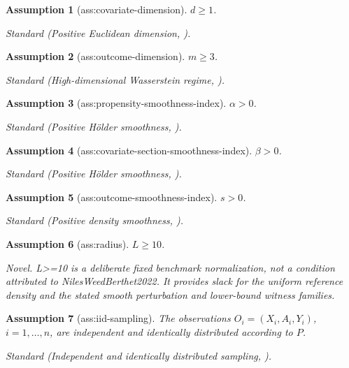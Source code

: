 \documentclass{article}
\newtheorem{assumption}{Assumption}
\begin{document}
\begin{assumption}[ass:covariate-dimension]\label{ass:covariate-dimension}
\(d\ge 1\).
\par\smallskip\noindent\emph{Standard} (Positive Euclidean dimension, \cite{NilesWeedBerthet2022}).
\end{assumption}

\begin{assumption}[ass:outcome-dimension]\label{ass:outcome-dimension}
\(m\ge 3\).
\par\smallskip\noindent\emph{Standard} (High-dimensional Wasserstein regime, \cite{NilesWeedBerthet2022}).
\end{assumption}

\begin{assumption}[ass:propensity-smoothness-index]\label{ass:propensity-smoothness-index}
\(\alpha>0\).
\par\smallskip\noindent\emph{Standard} (Positive Hölder smoothness, \cite{KennedyEtAl2024MinimaxCATE}).
\end{assumption}

\begin{assumption}[ass:covariate-section-smoothness-index]\label{ass:covariate-section-smoothness-index}
\(\beta>0\).
\par\smallskip\noindent\emph{Standard} (Positive Hölder smoothness, \cite{KennedyEtAl2024MinimaxCATE}).
\end{assumption}

\begin{assumption}[ass:outcome-smoothness-index]\label{ass:outcome-smoothness-index}
\(s>0\).
\par\smallskip\noindent\emph{Standard} (Positive density smoothness, \cite{NilesWeedBerthet2022}).
\end{assumption}

\begin{assumption}[ass:radius]\label{ass:radius}
\(L\ge 10\).
\par\smallskip\noindent\emph{Novel.} L>=10 is a deliberate fixed benchmark normalization, not a condition attributed to NilesWeedBerthet2022. It provides slack for the uniform reference density and the stated smooth perturbation and lower-bound witness families.
\end{assumption}

\begin{assumption}[ass:iid-sampling]\label{ass:iid-sampling}
The observations \(O_i=(X_i,A_i,Y_i)\), \(i=1,\ldots,n\), are independent and identically distributed according to \(P\).
\par\smallskip\noindent\emph{Standard} (Independent and identically distributed sampling, \cite{KennedyBalakrishnanWasserman2023}).
\end{assumption}
\end{document}
